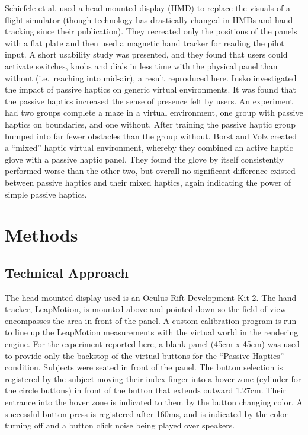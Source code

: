 \documentclass[]{aiaa-tc}%
\begin{document}
Schiefele et al.\cite{schiefele_simple_1998} used a head-mounted display (HMD) to replace the visuals of a flight simulator (though technology has drastically changed in HMDs and hand tracking since their publication).
They recreated only the positions of the panels with a flat plate and then used a magnetic hand tracker for reading the pilot input.
A short usability study was presented, and they found that users could activate switches, knobs and dials in less time with the physical panel than without (i.e.\ reaching into mid-air), a result reproduced here.
Insko\cite{insko_passive_2001} investigated the impact of passive haptics on generic virtual environments.
It was found that the passive haptics increased the sense of presence felt by users.
An experiment had two groups complete a maze in a virtual environment, one group with passive haptics on boundaries, and one without.
After training the passive haptic group bumped into far fewer obstacles than the group without.
Borst and Volz\cite{borst_evaluation_2005} created a ``mixed'' haptic virtual environment, whereby they combined an active haptic glove with a passive haptic panel.
They found the glove by itself consistently performed worse than the other two, but overall no significant difference existed between passive haptics and their mixed haptics, again indicating the power of simple passive haptics.

\section{Methods}
\subsection{Technical Approach}
The head mounted display used is an Oculus Rift Development Kit 2.
The hand tracker, LeapMotion, is mounted above and pointed down so the field of view encompasses the area in front of the panel.
A custom calibration program is run to line up the LeapMotion measurements with the virtual world in the rendering engine.
For the experiment reported here, a blank panel (45cm x 45cm) was used to provide only the backstop of the virtual buttons for the ``Passive Haptics'' condition.
Subjects were seated in front of the panel.
The button selection is registered by the subject moving their index finger into a hover zone (cylinder for the circle buttons) in front of the button that extends outward 1.27cm.
Their entrance into the hover zone is indicated to them by the button changing color.
A successful button press is registered after 160ms, and is indicated by the color turning off and a button click noise being played over speakers.
\end{document}
